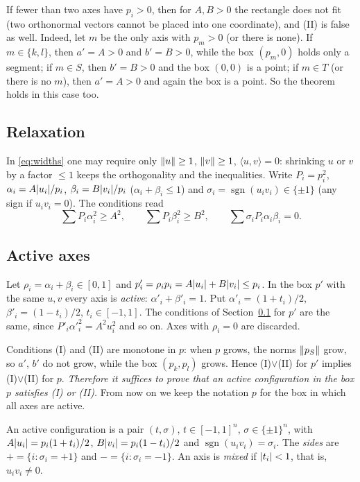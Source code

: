\documentclass[11pt]{article}
\theoremstyle{definition}
\theoremstyle{remark}
\newcommand{\sgn}{\operatorname{sgn}}
\DeclarePairedDelimiter{\abs}{\lvert}{\rvert}
\DeclarePairedDelimiter{\norm}{\lVert}{\rVert}
\begin{document}
If fewer than two axes have $p_i>0$, then for $A,B>0$ the rectangle does not fit (two orthonormal
vectors cannot be placed into one coordinate), and (II) is false as well. Indeed, let $m$ be the only
axis with $p_m>0$ (or there is none). If $m\in\{k,l\}$, then $a'=A>0$ and $b'=B>0$, while the box
$(p_m,0)$ holds only a segment; if $m\in S$, then $b'=B>0$ and the box $(0,0)$ is a point; if $m\in T$
(or there is no $m$), then $a'=A>0$ and again the box is a point. So the theorem holds in this case too.

\subsection{Relaxation}\label{sec:relax}
In \eqref{eq:widths} one may require only $\norm u\ge1$, $\norm v\ge1$, $\langle u,v\rangle=0$:
shrinking $u$ or $v$ by a factor $\le1$ keeps the orthogonality and the inequalities. Write
$P_i=p_i^2$, $\alpha_i=A\abs{u_i}/p_i$, $\beta_i=B\abs{v_i}/p_i$ ($\alpha_i+\beta_i\le1$) and
$\sigma_i=\sgn(u_iv_i)\in\{\pm1\}$ (any sign if $u_iv_i=0$). The conditions read
\[
\sum P_i\alpha_i^2\ge A^2,\qquad \sum P_i\beta_i^2\ge B^2,\qquad \sum\sigma_iP_i\alpha_i\beta_i=0 .
\]

\subsection{Active axes}\label{sec:active}
Let $\rho_i=\alpha_i+\beta_i\in[0,1]$ and $p'_i=\rho_ip_i=A\abs{u_i}+B\abs{v_i}\le p_i$. In the box $p'$
with the same $u,v$ every axis is \emph{active}: $\alpha'_i+\beta'_i=1$. Put
$\alpha'_i=(1+t_i)/2$, $\beta'_i=(1-t_i)/2$, $t_i\in[-1,1]$. The conditions of Section~\ref{sec:relax}
for $p'$ are the same, since $P'_i\alpha'^2_i=A^2u_i^2$ and so on. Axes with $\rho_i=0$ are discarded.

Conditions (I) and (II) are monotone in $p$: when $p$ grows, the norms $\norm{p_S}$ grow, so $a'$, $b'$ do
not grow, while the box $(p_k,p_l)$ grows. Hence (I)$\vee$(II) for $p'$ implies (I)$\vee$(II) for $p$.
\emph{Therefore it suffices to prove that an active configuration in the box $p$ satisfies (I) or (II).}
From now on we keep the notation $p$ for the box in which all axes are active.

An active configuration is a pair $(t,\sigma)$, $t\in[-1,1]^n$, $\sigma\in\{\pm1\}^n$, with
$A\abs{u_i}=p_i(1+t_i)/2$, $B\abs{v_i}=p_i(1-t_i)/2$ and $\sgn(u_iv_i)=\sigma_i$. The \emph{sides} are
$+=\{i:\sigma_i=+1\}$ and $-=\{i:\sigma_i=-1\}$. An axis is \emph{mixed} if $\abs{t_i}<1$, that is, $u_iv_i\ne0$.
\end{document}
